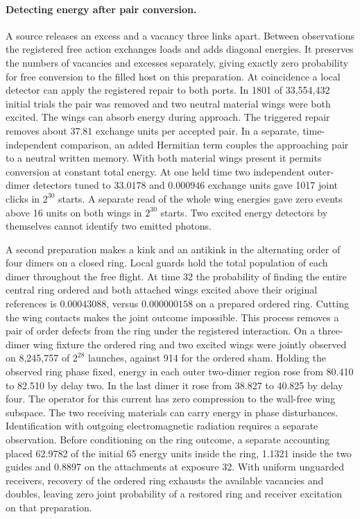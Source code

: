 \documentclass[11pt]{article}
\theoremstyle{definition}
\theoremstyle{remark}
\theoremstyle{plain}
\begin{document}
\paragraph{Detecting energy after pair conversion.}
A source releases an excess and a vacancy three links apart.
Between observations the registered free action exchanges loads and
adds diagonal energies. It preserves the numbers of vacancies and
excesses separately, giving exactly zero probability for free
conversion to the filled host on this preparation.
At coincidence a local detector can apply the registered repair to
both ports. In 1801 of 33,554,432 initial trials the pair was removed
and two neutral material wings were both excited. The wings can absorb
energy during approach. The triggered repair removes about $37.81$
exchange units per accepted pair. In a separate, time-independent
comparison, an added Hermitian term couples the approaching pair to a
neutral written memory. With both material wings present it permits
conversion at constant total energy. At one held time two independent
outer-dimer detectors tuned to $33.0178$ and $0.000946$ exchange
units gave 1017 joint clicks in $2^{30}$ starts. A separate read of
the whole wing energies gave zero events above 16 units on both wings
in $2^{30}$ starts. Two excited energy detectors by themselves
cannot identify two emitted photons.

A second preparation makes a kink and an antikink in the alternating
order of four dimers on a closed ring. Local guards hold the total
population of each dimer throughout the free flight. At time 32
the probability of finding the entire central ring ordered and both
attached wings excited above their original references is
$0.00043088$, versus $0.000000158$ on a prepared ordered ring. Cutting
the wing contacts makes the joint outcome impossible. This process
removes a pair of order defects from the ring under the registered
interaction. On a three-dimer wing fixture the ordered ring and two
excited wings were jointly observed on 8,245,757 of $2^{28}$ launches,
against 914 for the ordered sham. Holding the observed ring phase fixed,
energy in each outer two-dimer region rose from 80.410 to 82.510 by
delay two. In the last dimer it rose from 38.827 to 40.825 by delay
four. The operator for this current has zero compression to the
wall-free wing subspace. The two receiving materials can carry energy
in phase disturbances. Identification with outgoing electromagnetic
radiation requires a separate observation. Before conditioning on the
ring outcome, a separate accounting placed 62.9782 of the initial
65 energy units inside the ring, 1.1321 inside the two guides and
0.8897 on the attachments at exposure 32. With uniform unguarded
receivers, recovery of the ordered ring exhausts the available
vacancies and doubles, leaving zero joint probability of a restored
ring and receiver excitation on that preparation.
\end{document}
